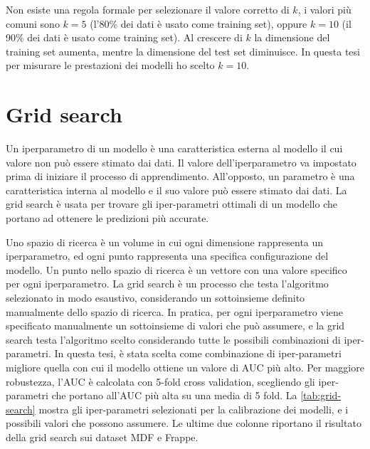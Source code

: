 \documentclass[12pt,italian]{report}
\begin{document}
Non esiste una regola formale per selezionare il valore corretto di $k$, i valori più comuni sono $k=5$ (l'80\% dei dati è usato come training set), oppure $k=10$ (il 90\% dei dati è usato come training set). Al crescere di $k$ la dimensione del training set aumenta, mentre la dimensione del test set diminuisce. In questa tesi per misurare le prestazioni dei modelli ho scelto $k = 10$.

\section{Grid search} \label{sec:grid-search}
Un iperparametro di un modello è una caratteristica esterna al modello il cui valore non può essere stimato dai dati. Il valore dell'iperparametro va impostato prima di iniziare il processo di apprendimento. All'opposto, un parametro è una caratteristica interna al modello e il suo valore può essere stimato dai dati. La grid search è usata per trovare gli iper-parametri ottimali di un modello che portano ad ottenere le predizioni più accurate. 

Uno spazio di ricerca è un volume in cui ogni dimensione rappresenta un iperparametro, ed ogni punto rappresenta una specifica configurazione del modello. Un punto nello spazio di ricerca è un vettore con una valore specifico per ogni iperparametro. La grid search è un processo che testa l'algoritmo selezionato in modo esaustivo, considerando un sottoinsieme definito manualmente dello spazio di ricerca. In pratica, per ogni iperparametro viene specificato manualmente un sottoinsieme di valori che può assumere, e la grid search testa l'algoritmo scelto
considerando tutte le possibili combinazioni di iper-parametri.
In questa tesi, è stata scelta come combinazione di iper-parametri migliore quella con cui il modello ottiene un valore di AUC più alto. Per maggiore robustezza, l'AUC è calcolata con 5-fold cross validation, scegliendo gli iper-parametri che portano all'AUC più alta su una media di 5 fold. La \autoref{tab:grid-search} mostra gli iper-parametri selezionati per la calibrazione dei modelli, e i possibili valori che possono assumere. Le ultime due colonne riportano il risultato della grid search sui dataset MDF e Frappe.
\end{document}
